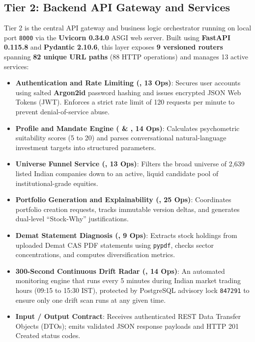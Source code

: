 \subsection{Tier 2: Backend API Gateway and Services}
Tier 2 is the central API gateway and business logic orchestrator running on local port \texttt{8000} via the \textbf{Uvicorn 0.34.0} ASGI web server. Built using \textbf{FastAPI 0.115.8} and \textbf{Pydantic 2.10.6}, this layer exposes \textbf{9 versioned routers} spanning \textbf{82 unique URL paths} (88 HTTP operations) and manages 13 active services:
\begin{itemize}
    \item \textbf{Authentication and Rate Limiting (, 13 Ops)}: Secures user accounts using salted \textbf{Argon2id} password hashing and issues encrypted JSON Web Tokens (JWT). Enforces a strict rate limit of 120 requests per minute to prevent denial-of-service abuse.
    \item \textbf{Profile and Mandate Engine ( \& , 14 Ops)}: Calculates psychometric suitability scores (5 to 20) and parses conversational natural-language investment targets into structured parameters.
    \item \textbf{Universe Funnel Service (, 13 Ops)}: Filters the broad universe of 2,639 listed Indian companies down to an active, liquid candidate pool of institutional-grade equities.
    \item \textbf{Portfolio Generation and Explainability (, 25 Ops)}: Coordinates portfolio creation requests, tracks immutable version deltas, and generates dual-level ``Stock-Why'' justifications.
    \item \textbf{Demat Statement Diagnosis (, 9 Ops)}: Extracts stock holdings from uploaded Demat CAS PDF statements using \texttt{pypdf}, checks sector concentrations, and computes diversification metrics.
    \item \textbf{300-Second Continuous Drift Radar (, 14 Ops)}: An automated monitoring engine that runs every 5 minutes during Indian market trading hours (09:15 to 15:30 IST), protected by PostgreSQL advisory lock \texttt{847291} to ensure only one drift scan runs at any given time.
    \item \textbf{Input / Output Contract}: Receives authenticated REST Data Transfer Objects (DTOs); emits validated JSON response payloads and HTTP 201 Created status codes.
\end{itemize}

